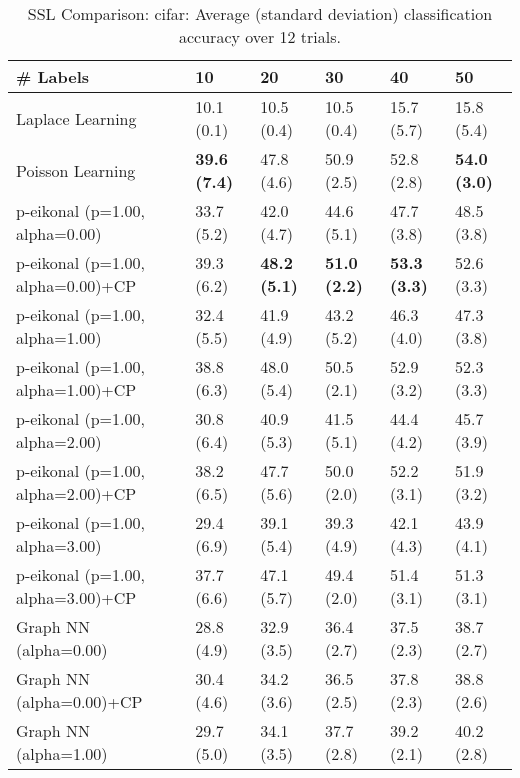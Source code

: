 \documentclass{article}
\begin{document}
\begin{table*}[t!]
\vspace{-3mm}
\caption{SSL Comparison: cifar: Average (standard deviation) classification accuracy over 12 trials.}
\vspace{-3mm}
\label{tab:SSL Comparison: cifar}
\vskip 0.15in
\begin{center}
\begin{small}
\begin{sc}
\begin{tabular}{llllll}
\toprule
\# Labels&\textbf{10}&\textbf{20}&\textbf{30}&\textbf{40}&\textbf{50}\\
\midrule
Laplace Learning&10.1 (0.1)      &10.5 (0.4)      &10.5 (0.4)      &15.7 (5.7)      &15.8 (5.4)      \\
Poisson Learning&{\bf 39.6 (7.4)}&47.8 (4.6)      &50.9 (2.5)      &52.8 (2.8)      &{\bf 54.0 (3.0)}\\
p-eikonal (p=1.00, alpha=0.00)&33.7 (5.2)      &42.0 (4.7)      &44.6 (5.1)      &47.7 (3.8)      &48.5 (3.8)      \\
p-eikonal (p=1.00, alpha=0.00)+CP&39.3 (6.2)      &{\bf 48.2 (5.1)}&{\bf 51.0 (2.2)}&{\bf 53.3 (3.3)}&52.6 (3.3)      \\
p-eikonal (p=1.00, alpha=1.00)&32.4 (5.5)      &41.9 (4.9)      &43.2 (5.2)      &46.3 (4.0)      &47.3 (3.8)      \\
p-eikonal (p=1.00, alpha=1.00)+CP&38.8 (6.3)      &48.0 (5.4)      &50.5 (2.1)      &52.9 (3.2)      &52.3 (3.3)      \\
p-eikonal (p=1.00, alpha=2.00)&30.8 (6.4)      &40.9 (5.3)      &41.5 (5.1)      &44.4 (4.2)      &45.7 (3.9)      \\
p-eikonal (p=1.00, alpha=2.00)+CP&38.2 (6.5)      &47.7 (5.6)      &50.0 (2.0)      &52.2 (3.1)      &51.9 (3.2)      \\
p-eikonal (p=1.00, alpha=3.00)&29.4 (6.9)      &39.1 (5.4)      &39.3 (4.9)      &42.1 (4.3)      &43.9 (4.1)      \\
p-eikonal (p=1.00, alpha=3.00)+CP&37.7 (6.6)      &47.1 (5.7)      &49.4 (2.0)      &51.4 (3.1)      &51.3 (3.1)      \\
Graph NN (alpha=0.00)&28.8 (4.9)      &32.9 (3.5)      &36.4 (2.7)      &37.5 (2.3)      &38.7 (2.7)      \\
Graph NN (alpha=0.00)+CP&30.4 (4.6)      &34.2 (3.6)      &36.5 (2.5)      &37.8 (2.3)      &38.8 (2.6)      \\
Graph NN (alpha=1.00)&29.7 (5.0)      &34.1 (3.5)      &37.7 (2.8)      &39.2 (2.1)      &40.2 (2.8)      \\

\end{tabular}
\end{sc}
\end{small}
\end{center}
\end{table*}
\end{document}
